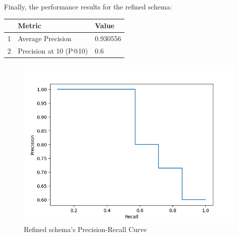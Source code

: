 Finally, the performance results for the refined schema:

\begin{center}
\begin{tabular}{lll}
\toprule
 &                  Metric &    Value \\
\midrule
1 &       Average Precision &  0.930556 \\
2 &  Precision at 10 (P@10) &       0.6 \\
\bottomrule
\end{tabular}
\end{center}

\begin{figure}[H]
    \centering
    \includegraphics[width=0.6\linewidth]{figures/disease.png}
    \caption{Refined schema's Precision-Recall Curve}
\end{figure}





